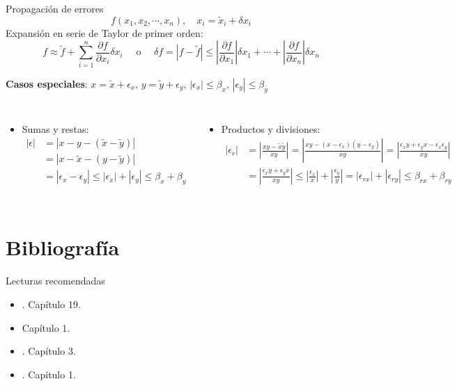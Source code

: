 \documentclass[9pt, aspectratio=169]{beamer}
\begin{document}
\begin{frame}{Propagación de errores}
  \[ f(x_1, x_2, \cdots, x_n), \quad x_i = \tilde{x}_i + \delta x_i \]
  Expansión en serie de Taylor de primer orden:
  \[ f \approx \tilde{f} + \sum_{i = 1}^n \frac{\partial f}{\partial x_i} \delta x_i\quad  \text{ o } \quad \delta f =|f - \tilde{f}| \leq \left| \frac{\partial f}{\partial x_1} \right| \delta x_1 + \cdots + \left| \frac{\partial f}{\partial x_n} \right| \delta x_n \]

  \textbf{Casos especiales}: $x = \tilde{x} + \epsilon_x, \, y = \tilde{y} + \epsilon_y, \, |\epsilon_x| \leq \beta_x, \, |\epsilon_y| \leq \beta_y$
  \begin{columns}[t]
    \begin{itemize}
      \item Sumas y restas:
            \begin{align*}
              |\epsilon| & = |x - y - (\tilde{x} - \tilde{y}) |                                                \\
                         & = |x - \tilde{x} - (y - \tilde{y}) |                                                \\
                         & = |\epsilon_x - \epsilon_y| \leq |\epsilon_x| + |\epsilon_y| \leq \beta_x + \beta_y
            \end{align*}
    \end{itemize}

    \begin{itemize}
      \item Productos y divisiones:
            \begin{align*}
              |\epsilon_r| & = \left| \frac{x y - \tilde{x} \tilde{y}}{xy} \right| = \left| \frac{x y - (x - \epsilon_x)(y - \epsilon_y)}{xy} \right| = \left| \frac{\epsilon_x y + \epsilon_y x - \epsilon_x \epsilon_y}{xy} \right| \\
                           & = \left| \frac{\epsilon_x y + \epsilon_y x}{xy} \right| \leq \left| \frac{\epsilon_x}{x} \right| + \left| \frac{\epsilon_y}{y} \right| = |\epsilon_{rx}| + |\epsilon_{ry} | \leq \beta_{rx} + \beta_{ry}
            \end{align*}

    \end{itemize}

  \end{columns}
\end{frame}

\section*{Bibliografía}
\begin{frame}{Lecturas recomendadas}
  \begin{itemize}
    \item {}. Capítulo 19.
    \item {} Capítulo 1.
    \item {}. Capítulo 3.
    \item {}. Capítulo 1.
  \end{itemize}
\end{frame}
\end{document}
